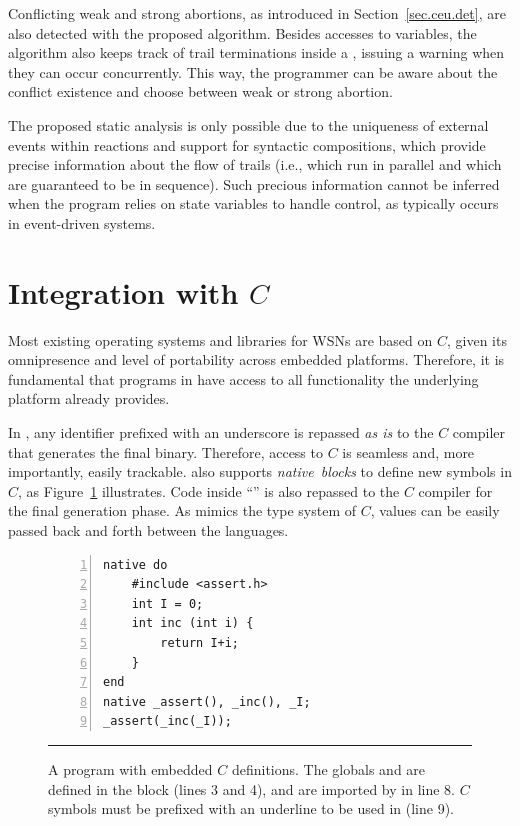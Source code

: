 Conflicting weak and strong abortions, as introduced in 
Section~\ref{sec.ceu.det}, are also detected with the proposed algorithm.
Besides accesses to variables, the algorithm also keeps track of trail 
terminations inside a , issuing a warning when they can occur 
concurrently.
This way, the programmer can be aware about the conflict existence and choose
between weak or strong abortion.

The proposed static analysis is only possible due to the uniqueness of external 
events within reactions and support for syntactic compositions, which provide 
precise information about the flow of trails (i.e., which run in parallel and 
which are guaranteed to be in sequence).
Such precious information cannot be inferred when the program relies on state 
variables to handle control, as typically occurs in event-driven systems.

\section{Integration with $C$}
\label{sec.ceu.c}

Most existing operating systems and libraries for WSNs are based on $C$, given 
its omnipresence and level of portability across embedded platforms.
Therefore, it is fundamental that programs in \CEU have access to all 
functionality the underlying platform already provides.

In \CEU, any identifier prefixed with an underscore is repassed \emph{as is} to 
the $C$ compiler that generates the final binary.
Therefore, access to $C$ is seamless and, more importantly, easily trackable.
%
\CEU also supports \emph{native~blocks} to define new symbols in $C$, as 
Figure~\ref{lst.c} illustrates.
Code inside ``'' is also repassed to the $C$ compiler 
for the final generation phase.
As \CEU{} mimics the type system of $C$, values can be easily passed back and 
forth between the languages.

\begin{figure}[t]
\begin{lstlisting}[numbers=left,xleftmargin=2em]
native do
    #include <assert.h>
    int I = 0;
    int inc (int i) {
        return I+i;
    }
end
native _assert(), _inc(), _I;
_assert(_inc(_I));
\end{lstlisting}
%
\rule{14cm}{0.37pt}
\caption{ A \CEU program with embedded $C$ definitions.
{\small %
The globals  and  are defined in the  block 
(lines 3 and 4), and are imported by \CEU in line 8.
$C$ symbols must be prefixed with an underline to be used in \CEU (line 9).
}%
\label{lst.c}
}
\end{figure}

